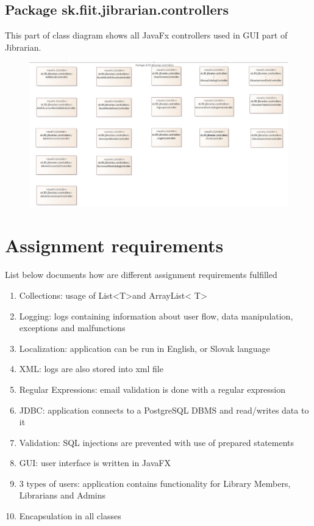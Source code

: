 \documentclass[11pt,twoside,a4paper]{article}
\begin{document}
\pagebreak
\subsection{Package sk.fiit.jibrarian.controllers}

This part of class diagram shows all JavaFx controllers used in GUI part of Jibrarian.

\begin{figure}[!ht]
    \includegraphics[scale=.4]{../ea/Class Diagram controllers.png}
    \centering
\end{figure}

\pagebreak
\section{Assignment requirements}

List below documents how are different assignment requirements fulfilled
\begin{enumerate}
    \item Collections: usage of List\textless T\textgreater and ArrayList\textless
          T\textgreater
    \item Logging: logs containing information about user flow, data manipulation,
          exceptions and malfunctions
    \item Localization: application can be run in English, or Slovak language
    \item XML: logs are also stored into xml file
    \item Regular Expressions: email validation is done with a regular expression
    \item JDBC: application connects to a PostgreSQL DBMS and read/writes data to it
    \item Validation: SQL injections are prevented with use of prepared statements
    \item GUI: user interface is written in JavaFX
    \item 3 types of users: application contains functionality for Library Members, Librarians and Admins
    \item Encapsulation in all classes
\end{enumerate}
\end{document}
